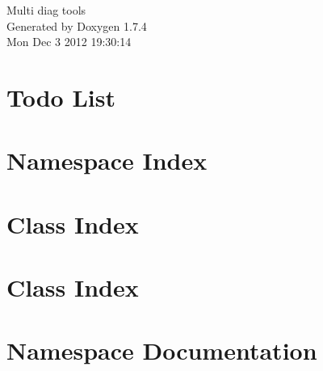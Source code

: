 \documentclass[a4paper]{book}
\begin{document}
\hypersetup{pageanchor=false}
\begin{titlepage}
\vspace*{7cm}
\begin{center}
{\Large Multi diag tools }\\
\vspace*{1cm}
{\large Generated by Doxygen 1.7.4}\\
\vspace*{0.5cm}
{\small Mon Dec 3 2012 19:30:14}\\
\end{center}
\end{titlepage}
\clearemptydoublepage
{}
\tableofcontents
\clearemptydoublepage
{}
\hypersetup{pageanchor=true}
\chapter{Todo List}
\label{todo}
\hypertarget{todo}{}

\chapter{Namespace Index}

\chapter{Class Index}

\chapter{Class Index}

\chapter{Namespace Documentation}

\end{document}
